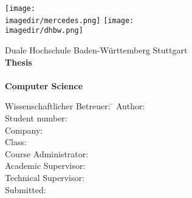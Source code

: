 \begin{titlepage}
\begin{minipage}{\textwidth}
		\vspace{-1cm}
		\noindent \texttt{[image: \\imagedir/mercedes.png]} \hfill \texttt{[image: \\imagedir/dhbw.png]}
\end{minipage}
\vspace{1em}
\begin{center}
	{\textsf{\large Duale Hochschule Baden-W\"urttemberg Stuttgart}}\\[4em]
	{\textsf{\textbf{\large{\DieArtDerArbeit} Thesis}}}\\[6mm]
	{\textsf{\textbf{\Large{}\DerTitelDerArbeit}}} \\[1.5cm]
	{\textsf{\textbf{\large{}Computer Science}}\\[6mm]
	\textsf{\textbf{\DieStudienrichtung}}}\vspace{10em}
	
	\begin{minipage}{\textwidth}
		\begin{tabbing}
		Wissenschaftlicher Betreuer: \hspace{0.85cm}\=\kill
		Author: \> \DerAutorDerArbeit \\[1.5mm]
		Student number: \> \DieMatrikelnummer \\[1.5mm]
		Company: \> \DerNameDerFirma  \\[1.5mm]
		Class: \> \DieKursbezeichnung \\[1.5mm]
		Course Administrator: \> \DerStudiengangsleiter \\[1.5mm]
		Academic Supervisor: \> \DerWissBetreuer \\[1.5mm]
		Technical Supervisor: \> \DerFirmenBetreuer \\[1.5mm]
		Submitted: \> \DasAbgabedatum	
		\end{tabbing}
	\end{minipage}
\end{center}
\end{titlepage}